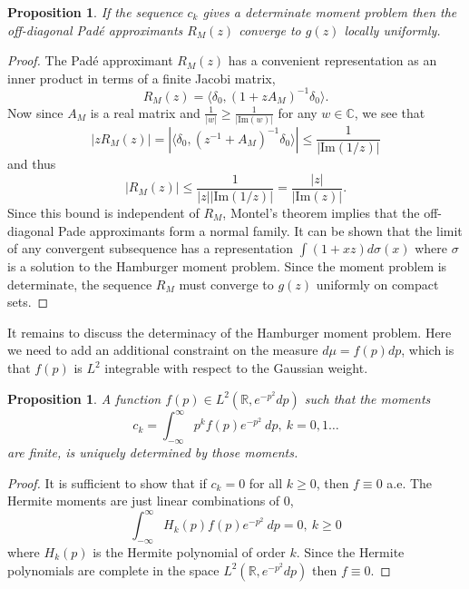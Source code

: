 \documentclass{amsart}
\newtheorem{proposition}[theorem]{Proposition}
\theoremstyle{remark}
\numberwithin{equation}{section}
\newcommand{\CC}{\mathbb{C}}
\begin{document}
\begin{proposition}
    If the sequence $c_k$ gives a determinate moment problem then the off-diagonal Pad\'e approximants $R_M(z)$ converge to $g(z)$ locally uniformly.
\end{proposition}

\begin{proof}
    The Pad\'e approximant $R_M(z)$ has a convenient representation as an inner product in terms of a finite Jacobi matrix,
    \[
        R_M(z) = \langle \delta_0, (1 + zA_M)^{-1} \delta_0 \rangle.
    \]
    Now since $A_M$ is a real matrix and $\frac1{|w|} \geq \frac1{|\text{Im}(w)|}$ for any $w \in \CC$, we see that
    \[
        |zR_M(z)| = |\langle \delta_0, (z^{-1} + A_M)^{-1} \delta_0 \rangle| \leq \frac1{|\text{Im}(1/z)|}
    \]
    and thus
    \[
        |R_M(z)| \leq \frac1{|z||\text{Im}(1/z)|} = \frac{|z|}{|\text{Im}(z)|}.
    \]
    Since this bound is independent of $R_M$, Montel's theorem implies that the off-diagonal Pade approximants form a normal family. It can be shown that the limit of any convergent subsequence has a representation $\int (1+ xz)d\sigma(x)$ where $\sigma$ is a solution to the Hamburger moment problem. Since the moment problem is determinate, the sequence $R_M$ must converge to $g(z)$ uniformly on compact sets.
\end{proof}

It remains to discuss the determinacy of the Hamburger moment problem. Here we need to add an additional constraint on the measure $d\mu = f(p)dp$, which is that $f(p)$ is $L^2$ integrable with respect to the Gaussian weight.

\begin{proposition}
    A function $f(p) \in L^2(\mathbb{R}, e^{-p^2}dp)$ such that the moments 
    \begin{equation}
        \label{eq:3}
        c_k = \int_{-\infty}^\infty p^k f(p) e^{-p^2} ~dp, ~ k = 0, 1 \ldots
    \end{equation}
    are finite, is uniquely determined by those moments.
\end{proposition}
    
\begin{proof}
    It is sufficient to show that if $c_k = 0$ for all $k \geq 0$, then $f \equiv 0$ a.e. The Hermite moments are just linear combinations of $0$,
    \[
        \int_{-\infty}^\infty H_k(p) f(p) e^{-p^2} ~dp = 0, ~ k \geq 0
    \]
    where $H_k(p)$ is the Hermite polynomial of order $k$. Since the Hermite polynomials are complete in the space $L^2(\mathbb{R}, e^{-p^2}dp)$ then $f \equiv 0$.
\end{proof}
\end{document}

